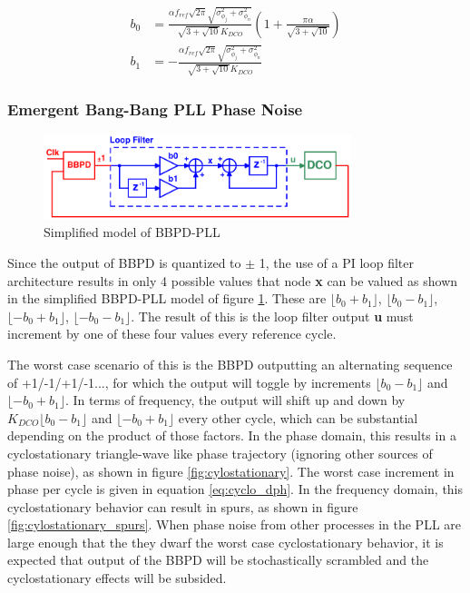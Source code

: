 			\begin{align}
				b_0 &= \frac{\alpha f_{ref}\sqrt{2\pi}\sqrt{\sigma^2_{\phi_j} + \sigma^2_{\phi_n}}}{\sqrt{3+\sqrt{10}}K_{DCO}} \left(1+\frac{\pi\alpha}{\sqrt{3+\sqrt{10}}}\right)\label{eq:b0_}\\
				 b_1 &= - \frac{\alpha f_{ref}\sqrt{2\pi}\sqrt{\sigma^2_{\phi_j} + \sigma^2_{\phi_n}}}{\sqrt{3+\sqrt{10}}K_{DCO}}\label{eq:b1_}
			\end{align}


			\FloatBarrier\subsubsection{Emergent Bang-Bang PLL Phase Noise}\label{sec:bb_noise}

		\begin{figure}
			\center\includegraphics[width=0.8\textwidth, angle=0]{./figs/design/simplified_bbpll}
			\caption{Simplified model of BBPD-PLL}
			\label{fig:simp_bbpdpll}
		\end{figure}
		Since the output of BBPD is quantized to $\pm$ 1, the use of a PI loop filter architecture results in only 4 possible values that node {\color{blue}\textbf{x}} can be valued as shown in the simplified BBPD-PLL model of figure \ref{fig:simp_bbpdpll}. These are $\lfloor b_0+b_1 \rfloor$, $\lfloor b_0-b_1 \rfloor$, $\lfloor -b_0+b_1 \rfloor$, $\lfloor -b_0-b_1 \rfloor$. The result of this is the loop filter output {\color{teal}\textbf{u}} must increment by one of these four values every reference cycle. 

		The worst case scenario of this is the BBPD outputting an alternating sequence of +1/-1/+1/-1..., for which the output will toggle by increments $\lfloor b_0-b_1 \rfloor$ and $\lfloor -b_0+b_1 \rfloor$. In terms of frequency, the output will shift up and down by $K_{DCO}\lfloor b_0-b_1 \rfloor$ and $\lfloor -b_0+b_1 \rfloor$ every other cycle, which can be substantial depending on the product of those factors. In the phase domain, this results in a cyclostationary triangle-wave like phase trajectory (ignoring other sources of phase noise), as shown in figure \ref{fig:cylostationary}. The worst case increment in phase per cycle is given in equation \ref{eq:cyclo_dph}. In the frequency domain, this cyclostationary behavior can result in spurs, as shown in figure \ref{fig:cylostationary_spurs}. When phase noise from other processes in the PLL are large enough that the they dwarf the worst case cyclostationary behavior, it is expected that output of the BBPD will be stochastically scrambled and the cyclostationary effects will be subsided. 

